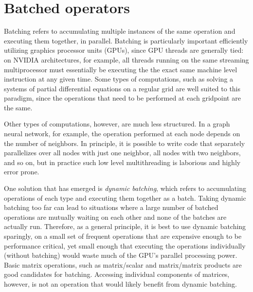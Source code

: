 \clearpage
\section*{Batched operators}

Batching refers to accumulating multiple instances of the same operation and executing them together, in parallel. 
Batching is particularly important efficiently utilizing graphics processor units (GPUs), 
since GPU threads are generally tied: 
on NVIDIA architectures, for example, all threads running on the same streaming 
multiprocessor must essentially be executing the the exact same machine level instruction at any given time. 
Some types of computations, such as 
solving a systems of partial differential equations on a regular grid are well suited to this 
paradigm, since %
the operations that need to be performed at each gridpoint are the same.

Other types of computations, however, are much less structured. 
In a graph neural network, for example, the operation performed at each node depends 
on the number of neighbors. In principle, it is possible to write code that 
separately parallelizes over all nodes 
with just one neighbor, all nodes with two neighbors, and so on, 
but in practice such low level multithreading is laborious and highly error prone. 

One solution that has emerged is \emph{dynamic batching}, which refers to accumulating operations of each 
type and executing them together as a batch. %
Taking dynamic batching too far can lead to situations where a large number of batched operations 
are mutually waiting on each other and none of the batches are actually run. 
Therefore, as a general principle, it is best to use dynamic batching sparingly, on a 
small set of frequent operations that are 
expensive enough to be performance critical, 
yet small enough that executing the operations individually (without batching) would waste much 
of the GPU's parallel processing power.  
Basic matrix operations, such as matrix/scalar and matrix/matrix products are good candidates 
for batching. Accessing individual components of matrices, however, is not an operation that would 
likely benefit from dynamic batching. 

